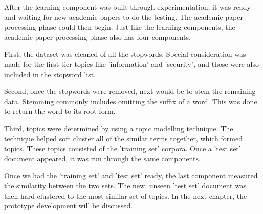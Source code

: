 After the learning component was built through experimentation, it was ready and waiting for new academic papers to do the testing. The academic paper processing phase could then begin. Just like the learning components, the academic paper processing phase also has four components.

First, the dataset was cleaned of all the stopwords. Special consideration was made for the first-tier topics like ’information’ and ’security’, and those were also included in the stopword list.

Second, once the stopwords were removed, next would be to stem the remaining data. Stemming commonly includes omitting the suffix of a word. This was done to return the word to its root form.

Third, topics were determined by using a topic modelling technique. The technique helped soft cluster all of the similar terms together, which formed topics. These topics consisted of the ’training set’ corpora. Once a ’test set’ document appeared, it was run through the same components.

Once we had the ’training set’ and ’test set’ ready, the last component measured the similarity between the two sets. The new, unseen ’test set’ document was then hard clustered to the most similar set of topics. In the next chapter, the prototype development will be discussed.
